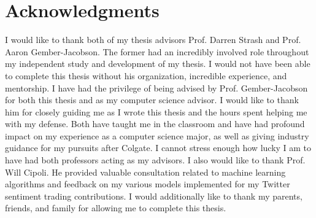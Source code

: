 \documentclass[../thesis.tex]{subfiles}
\begin{document}
\chapter*{Acknowledgments}

I would like to thank both of my thesis advisors Prof. Darren Strash and Prof. Aaron Gember-Jacobson. The former had an incredibly involved role throughout my independent study and development of my thesis. I would not have been able to complete this thesis without his organization, incredible experience, and mentorship. I have had the privilege of being advised by Prof. Gember-Jacobson for both this thesis and as my computer science advisor. I would like to thank him for closely guiding me as I wrote this thesis and the hours spent helping me with my defense. Both have taught me in the classroom and have had profound impact on my experience as a computer science major, as well as giving industry guidance for my pursuits after Colgate. I cannot stress enough how lucky I am to have had both professors acting as my advisors. I also would like to thank Prof. Will Cipoli. He provided valuable consultation related to machine learning algorithms and feedback on my various models implemented for my Twitter sentiment trading contributions. I would additionally like to thank my parents, friends, and family for allowing me to complete this thesis. 

\cleardoublepage
\end{document}
